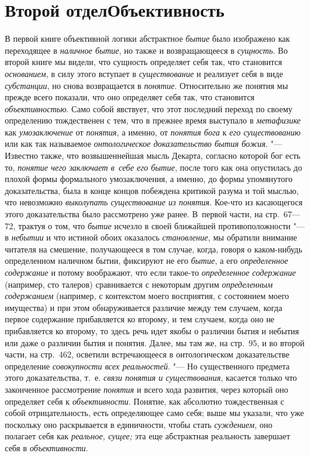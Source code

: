 \clearpage\part[Второй отдел\newline ОБЪЕКТИВНОСТЬ]{Второй отдел\newline Объективность}
В первой книге объективной логики абстрактное {\em бытие} было
изображено как переходящее в {\em наличное бытие}, но
также и возвращающееся в {\em сущность}. Во второй
книге мы видели, что сущность определяет себя так, что становится
{\em основанием}, в силу этого вступает в {\em существование}
и реализует себя в виде {\em субстанции}, но
снова возвращается в {\em понятие}.
Относительно же понятия мы прежде всего показали, что оно
определяет себя так, что становится {\em объективностью}.
Само собой явствует, что этот последний переход по своему
определению тождественен с тем, что в прежнее время выступало в
{\em метафизике} как {\em умозаключение} от {\em понятия}, а именно,
от {\em понятия бога} к {\em его существованию} или как так называемое
{\em онтологическое доказательство бытия
божия}. "--- Известно также, что возвышеннейшая мысль Декарта,
согласно которой бог есть то, {\em понятие чего заключает в~себе его
бытие}, после того как она опустилась до плохой формы
формального умозаключения, а именно, до формы упомянутого доказательства,
была в конце концов побеждена критикой разума и той мыслью, что невозможно
{\em выколупать существование из
понятия}. Кое-что из касающегося этого доказательства было
рассмотрено уже ранее. В~первой части, на стр.~67---72, трактуя о том, что
{\em бытие} исчезло в своей ближайшей противоположности "--- в
{\em небытии} и что истиной обоих оказалось {\em становление}, мы
обратили внимание читателя на смешение, получающееся в том случае, когда,
говоря о каком-нибудь определенном наличном бытии, фиксируют не его
{\em бытие}, а его {\em определенное содержание}
и потому воображают, что если такое-то {\em определенное содержание}
(например, сто талеров) сравнивается с некоторым другим
{\em определенным содержанием}
(например, с контекстом моего восприятия, с состоянием моего
имущества) и при этом обнаруживается различие между тем случаем, когда
первое содержание прибавляется ко второму, и тем случаем, когда оно не
прибавляется ко второму, то здесь речь идет якобы о различии бытия и
небытия или даже о различии бытия и понятия. Далее, мы там же, на стр.~95,
и во второй части, на стр.~462, осветили встречающееся в онтологическом
доказательстве определение {\em совокупности всех реальностей}. "---
Но существенного предмета этого доказательства, т.~е.
{\em связи понятия и существования},
касается только что законченное рассмотрение {\em понятия} и всего
хода развития, через который оно определяет себя к {\em объективности}.
Понятие, как абсолютно тождественная с собой отрицательность,
есть определяющее само себя; выше мы указали, что уже поскольку оно
раскрывается в единичности, чтобы стать {\em суждением}, оно
полагает себя как {\em реальное, сущее;} эта еще
абстрактная реальность завершает себя в {\em объективности}.

